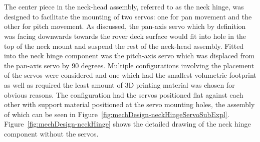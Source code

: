       \\\\
        The center piece in the neck-head assembly, referred to as the neck hinge, was designed to facilitate the mounting of two servos: one for pan movement and the other for pitch movement. As discussed, the pan-axis servo which by definition was facing downwards towards the rover deck surface would fit into hole in the top of the neck mount and suspend the rest of the neck-head assembly. Fitted into the neck hinge component was the pitch-axis servo which was displaced from the pan-axis servo by 90 degrees. Multiple configurations involving the placement of the servos were considered and one which had the smallest volumetric footprint as well as required the least amount of 3D printing material was chosen for obvious reasons. The configuration had the servos positioned flat against each other with support material positioned at the servo mounting holes, the assembly of which can be seen in Figure~\ref{fig:mechDesign-neckHingeServoSubExpl}. Figure~\ref{fig:mechDesign-neckHinge} shows the detailed drawing of the neck hinge component without the servos.
        
